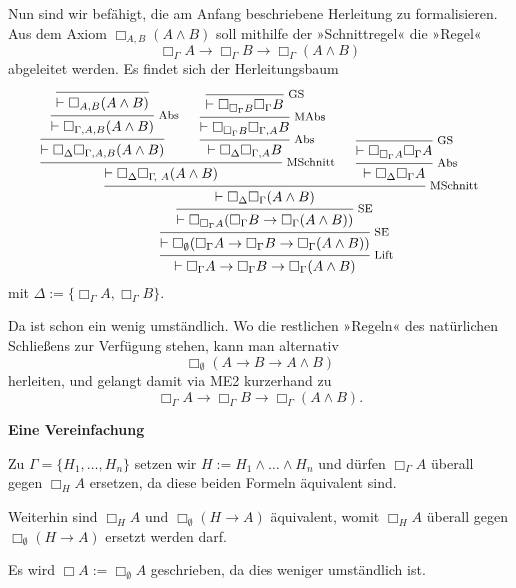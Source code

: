 \documentclass[9pt,fleqn,aspectratio=169]{beamer}
\newcommand{\strong}[1]{\textbf{#1}}
\newcommand{\parspace}{\vspace{0.8em}}
\newcommand{\headline}[1]{\begin{center}\strong{#1}\end{center}}
\newcommand{\lnec}{\Box}
\newcommand{\inote}[1]{{\!\footnotesize #1}}
\begin{document}
\begin{frame}
Nun sind wir befähigt, die am Anfang beschriebene Herleitung zu formalisieren.
Aus dem Axiom $\lnec_{A,B} (A\land B)$ soll mithilfe der »Schnittregel« die »Regel«
\[\lnec_\Gamma A\to\lnec_\Gamma B\to\lnec_\Gamma (A\land B)\]
abgeleitet werden. Es findet sich der Herleitungsbaum\pause
\[\begin{prooftree}
              \infer0{\vdash\lnec_{A,B}(A\land B)}
            \infer1[\inote{Abs}]{\vdash\lnec_{\Gamma,A,B}(A\land B)}
          \infer1{\vdash\lnec_\Delta\lnec_{\Gamma,A,B}(A\land B)}
              \infer0[\inote{GS}]{\vdash\lnec_{\lnec_\Gamma B}\lnec_\Gamma B}
            \infer1[\inote{MAbs}]{\vdash\lnec_{\lnec_\Gamma B}\lnec_{\Gamma,A} B}
          \infer1[\inote{Abs}]{\vdash\lnec_\Delta\lnec_{\Gamma,A} B}
        \infer2[\inote{MSchnitt}]{\vdash\lnec_\Delta\lnec_{\Gamma\!,\,\,A}(A\land B)}
          \infer0[\inote{GS}]{\vdash\lnec_{\lnec_\Gamma A}\lnec_\Gamma A}
        \infer1[\inote{Abs}]{\vdash\lnec_\Delta\lnec_\Gamma A}
      \infer2[\inote{MSchnitt}]{\vdash\lnec_\Delta\lnec_\Gamma (A\land B)}
    \infer1[\inote{SE}]{\vdash\lnec_{\lnec_\Gamma A}(\lnec_\Gamma B\to\lnec_\Gamma (A\land B))}
  \infer1[\inote{SE}]{\vdash\lnec_\emptyset(\lnec_\Gamma A\to\lnec_\Gamma B\to\lnec_\Gamma (A\land B))}
\infer1[\inote{Lift}]{\vdash\lnec_\Gamma A\to\lnec_\Gamma B\to\lnec_\Gamma (A\land B)}
\end{prooftree}\]
mit $\Delta:=\{\lnec_\Gamma A,\lnec_\Gamma B\}$.
\end{frame}

\begin{frame}
Da ist schon ein wenig umständlich. Wo die restlichen »Regeln« des
natürlichen Schließens zur Verfügung stehen, kann man alternativ
\[\lnec_\emptyset(A\to B\to A\land B)\]
herleiten, und gelangt damit via ME2 kurzerhand zu
\[\lnec_\Gamma A\to\lnec_\Gamma B\to\lnec_\Gamma (A\land B).\]
\end{frame}

\begin{frame}
\headline{Eine Vereinfachung}
\end{frame}

\begin{frame}
Zu $\Gamma=\{H_1,\ldots,H_n\}$ setzen wir $H:=H_1\land\ldots\land H_n$
und dürfen $\lnec_\Gamma A$ überall gegen $\lnec_H A$ ersetzen,
da diese beiden Formeln äquivalent sind.\pause

\parspace
Weiterhin sind $\lnec_H A$ und $\lnec_\emptyset (H\to A)$ äquivalent,
womit $\lnec_H A$ überall gegen $\lnec_\emptyset (H\to A)$ ersetzt
werden darf.\pause

\parspace
Es wird $\lnec A:=\lnec_\emptyset A$ geschrieben, da dies weniger
umständlich ist.
\end{frame}
\end{document}
